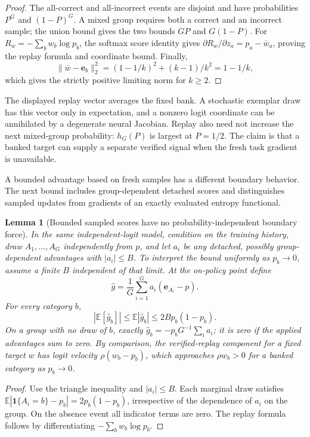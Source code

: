 \documentclass{article}
\newcommand{\1}{\mathbf 1}
\newcommand{\E}{\mathbb E}
\newtheorem{lemma}{Lemma}[section]
\theoremstyle{remark}
\theoremstyle{definition}
\theoremstyle{plain}
\begin{document}
\begin{proof}
The all-correct and all-incorrect events are disjoint and have probabilities
$P^G$ and $(1-P)^G$. A mixed group requires both a correct and an incorrect
sample; the union bound gives the two bounds $GP$ and $G(1-P)$.
For $R_w=-\sum_b w_b\log p_b$, the softmax score identity gives
$\partial R_w/\partial z_a=p_a-\bar w_a$, proving the replay formula and
coordinate bound. Finally,
\[
 \|\bar w-\mathbf e_b\|_2^2=(1-1/k)^2+(k-1)/k^2=1-1/k,
\]
which gives the strictly positive limiting norm for $k\ge2$.
\end{proof}


The displayed replay vector averages the fixed bank. A stochastic exemplar
draw has this vector only in expectation, and a nonzero logit coordinate can
be annihilated by a degenerate neural Jacobian. Replay also need not increase
the next mixed-group probability: $h_G(P)$ is largest at $P=1/2$. The claim
is that a banked target can supply a separate verified signal when the fresh
task gradient is unavailable.

A bounded advantage based on fresh samples has a different boundary behavior.
The next bound includes group-dependent detached scores and distinguishes
sampled updates from gradients of an exactly evaluated entropy functional.

\begin{lemma}[Bounded sampled scores have no probability-independent boundary force]
\label{lem:sampled-score-bound}
In the same independent-logit model, condition on the training history, draw
$A_1,\ldots,A_G$ independently from $p$, and let $a_i$ be any detached,
possibly group-dependent advantages with $|a_i|\le B$. To interpret the
bound uniformly as $p_b\to0$, assume a finite $B$ independent of that limit.
At the on-policy point define
\[
 \widehat g=\frac1G\sum_{i=1}^G a_i(\mathbf e_{A_i}-p).
\]
For every category $b$,
\[
 |\E[\widehat g_b]|\le\E|\widehat g_b|
 \le 2B p_b(1-p_b).
\]
On a group with no draw of $b$, exactly
$\widehat g_b=-p_bG^{-1}\sum_i a_i$; it is zero if the applied advantages
sum to zero. By comparison, the verified-replay component for a fixed target
$w$ has logit velocity $\rho(w_b-p_b)$, which approaches $\rho w_b>0$
for a banked category as $p_b\to0$.
\end{lemma}

\begin{proof}
Use the triangle inequality and $|a_i|\le B$. Each marginal draw satisfies
$\E|\1\{A_i=b\}-p_b|=2p_b(1-p_b)$, irrespective of the dependence of
$a_i$ on the group. On the absence event all indicator terms are zero.
The replay formula follows by differentiating $-\sum_b w_b\log p_b$.
\end{proof}
\end{document}
